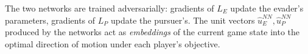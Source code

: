 \documentclass[11pt]{article}
\begin{document}
The two networks are trained adversarially: gradients of $L_E$ update the
evader's parameters, gradients of $L_P$ update the pursuer's.  The unit
vectors $\hat{u}_E^{NN}, \hat{u}_P^{NN}$ produced by the networks act as
\emph{embeddings} of the current game state into the optimal direction
of motion under each player's objective.
\end{document}
